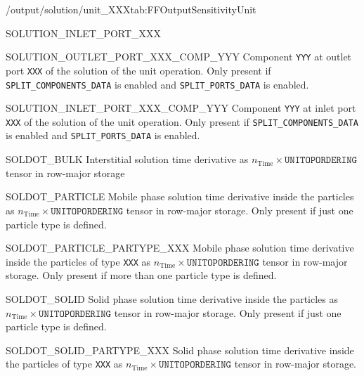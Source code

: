 \begin{groupscope}{/output/solution/unit\_XXX}{tab:FFOutputSensitivityUnit}
\begin{dataset}[type=double,unit={\si{\mol\per\cubic\metre\of{IV}}}]{SOLUTION\_INLET\_PORT\_XXX}
  \end{dataset}
  \begin{dataset}[type=double,unit={\si{\mol\per\cubic\metre\of{IV}}}]{SOLUTION\_OUTLET\_PORT\_XXX\_COMP\_YYY}
    Component \texttt{YYY} at outlet port \texttt{XXX} of the solution of the unit operation.
    Only present if \texttt{SPLIT\_COMPONENTS\_DATA} is enabled and \texttt{SPLIT\_PORTS\_DATA} is enabled.
  \end{dataset}
  \begin{dataset}[type=double,unit={\si{\mol\per\cubic\metre\of{IV}}}]{SOLUTION\_INLET\_PORT\_XXX\_COMP\_YYY}
    Component \texttt{YYY} at inlet port \texttt{XXX} of the solution of the unit operation.
    Only present if \texttt{SPLIT\_COMPONENTS\_DATA} is enabled and \texttt{SPLIT\_PORTS\_DATA} is enabled.
  \end{dataset}
  \begin{dataset}[type=double,unit={\si{\mol\per\cubic\metre\of{IV}\per\second}}]{SOLDOT\_BULK}
    Interstitial solution time derivative as $n_{\text{Time}} \times \texttt{UNITOPORDERING}$ tensor in row-major storage
  \end{dataset}
  \begin{dataset}[type=double,unit={\si{\mol\per\cubic\metre\of{MP}\per\second}}]{SOLDOT\_PARTICLE}
    Mobile phase solution time derivative inside the particles as $n_{\text{Time}} \times \texttt{UNITOPORDERING}$ tensor in row-major storage.
    Only present if just one particle type is defined.
  \end{dataset}
  \begin{dataset}[type=double,unit={\si{\mol\per\cubic\metre\of{MP}\per\second}}]{SOLDOT\_PARTICLE\_PARTYPE\_XXX}
    Mobile phase solution time derivative inside the particles of type \texttt{XXX} as $n_{\text{Time}} \times \texttt{UNITOPORDERING}$ tensor in row-major storage.
    Only present if more than one particle type is defined.
  \end{dataset}
  \begin{dataset}[type=double,unit={\si{\mol\per\cubic\metre\of{MP}\per\second}}]{SOLDOT\_SOLID}
    Solid phase solution time derivative inside the particles as $n_{\text{Time}} \times \texttt{UNITOPORDERING}$ tensor in row-major storage.
    Only present if just one particle type is defined.
  \end{dataset}
  \begin{dataset}[type=double,unit={\si{\mol\per\cubic\metre\of{SP}\per\second}}]{SOLDOT\_SOLID\_PARTYPE\_XXX}
    Solid phase solution time derivative inside the particles of type \texttt{XXX} as $n_{\text{Time}} \times \texttt{UNITOPORDERING}$ tensor in row-major storage.

\end{dataset}
\end{groupscope}
